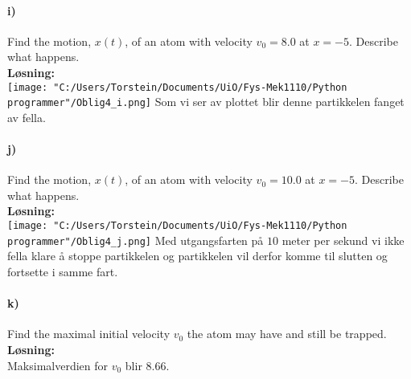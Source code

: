 \documentclass[11pt, A4paper,norsk]{article}
\begin{document}
		\paragraph{i)}
			\begin{flushleft}
Find the motion, $x(t)$, of an atom with velocity $v_0 = 8.0$ at $x = -5$. Describe what happens. \\
\vspace{1mm}
\textbf{Løsning:} \\
\vspace{1mm}
\texttt{[image: "C:/Users/Torstein/Documents/UiO/Fys-Mek1110/Python programmer"/Oblig4\_i.png]}
Som vi ser av plottet blir denne partikkelen fanget av fella.

			\end{flushleft}












		\paragraph{j)}
			\begin{flushleft}
Find the motion, $x(t)$, of an atom with velocity $v_0 = 10.0$ at $x = -5$. Describe what happens. \\
\vspace{1mm}
\textbf{Løsning:} \\
\vspace{1mm}
\texttt{[image: "C:/Users/Torstein/Documents/UiO/Fys-Mek1110/Python programmer"/Oblig4\_j.png]}
Med utgangsfarten på $10$ meter per sekund vi ikke fella klare å stoppe partikkelen og partikkelen vil derfor komme til slutten og fortsette i samme fart.

			\end{flushleft}















		\paragraph{k)}
			\begin{flushleft}
Find the maximal initial velocity $v_0$ the atom may have and still be trapped. \\
\vspace{1mm}
\textbf{Løsning:} \\
\vspace{1mm}
Maksimalverdien for $v_0$ blir $8.66$.

			\end{flushleft}
\end{document}
